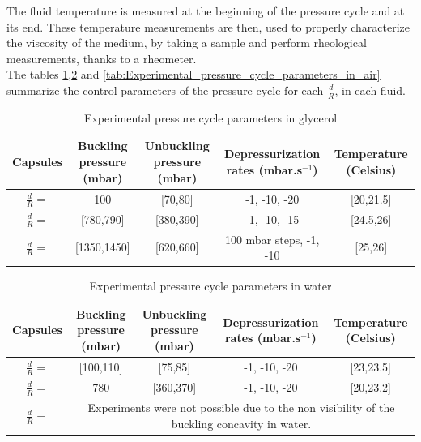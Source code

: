 The fluid temperature is measured at the beginning of the pressure cycle and at its end. These temperature measurements are then, used to properly characterize the viscosity of the medium, by taking a sample and perform rheological measurements, thanks to a rheometer.\\
The tables \ref{tab:Experimental_pressure_cycle_parameters_in_glycerol},\ref{tab:Experimental_pressure_cycle_parameters_in_water} and \ref{tab:Experimental_pressure_cycle_parameters_in_air} summarize the control parameters of the pressure cycle for each $\frac{d}{R}$, in each fluid.
\begin{table}[H]
	\centering
		\begin{adjustbox}{width=\textwidth}
			\begin{tabular}{|c|c|c|c|c|}
				\hline
				Capsules & Buckling pressure (mbar) & Unbuckling pressure (mbar) & Depressurization rates (mbar.s$^{-1}$) & Temperature (Celsius) \\
				\hline
				$\frac{d}{R} = $ & 100 & [70,80] & -1, -10, -20 & [20,21.5]\\
				\hline
				$\frac{d}{R} = $ & [780,790] & [380,390] & -1, -10, -15 & [24.5,26]\\
				\hline
				$\frac{d}{R} = $ & [1350,1450] & [620,660] & 100 mbar steps, -1, -10 & [25,26]\\
				\hline
			\end{tabular}
		\end{adjustbox}
	
	\caption{Experimental pressure cycle parameters in glycerol}
	\label{tab:Experimental_pressure_cycle_parameters_in_glycerol}
\end{table}

\begin{table}[H]
	\centering
		\begin{adjustbox}{width=\textwidth}
			\begin{tabular}{|c|c|c|c|c|}
				\hline
				Capsules & Buckling pressure (mbar) & Unbuckling pressure (mbar) & Depressurization rates (mbar.s$^{-1}$) & Temperature (Celsius) \\
				\hline
				$\frac{d}{R} = $ & [100,110]& [75,85] & -1, -10, -20 & [23,23.5]\\
				\hline
				$\frac{d}{R} = $ & 780 & [360,370] & -1, -10, -20 & [20,23.2]\\
				\hline
				$\frac{d}{R} = $ &  \multicolumn{4}{c|}{Experiments were not possible due to the non visibility of the buckling concavity in water.}\\
				\hline
			\end{tabular}
		\end{adjustbox}
	
	\caption{Experimental pressure cycle parameters in water}
	\label{tab:Experimental_pressure_cycle_parameters_in_water}
\end{table}

